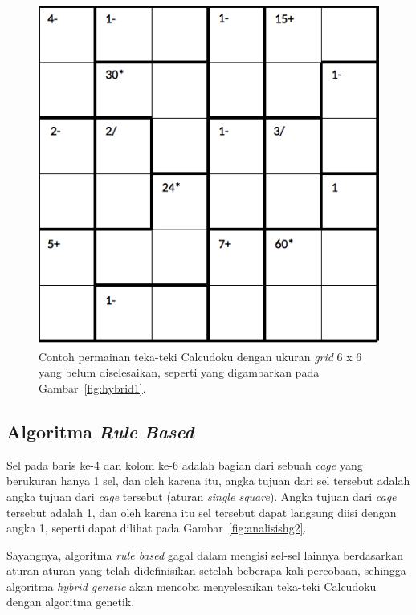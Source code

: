 \begin{figure}
\centering
\captionsetup{justification=centering}
\includegraphics[scale=0.333]{Gambar/hybridgenetic/Puzzle}
\caption[Contoh permainan teka-teki Calcudoku dengan ukuran \textit{grid} 6 x 6 yang belum diselesaikan, seperti yang digambarkan pada Gambar~\ref{fig:hybrid1}. \cite{johanna:12:hybrid}]{Contoh permainan teka-teki Calcudoku dengan ukuran \textit{grid} 6 x 6 yang belum diselesaikan, seperti yang digambarkan pada Gambar~\ref{fig:hybrid1}. \cite{johanna:12:hybrid}}
\label{fig:analisishg1}
\end{figure}

\subsection{Algoritma \textit{Rule Based}}
\label{sec:analisisrb}

Sel pada baris ke-4 dan kolom ke-6 adalah bagian dari sebuah \textit{cage} yang berukuran hanya 1 sel, dan oleh karena itu, angka tujuan dari sel tersebut adalah angka tujuan dari \textit{cage} tersebut (aturan \textit{single square}). Angka tujuan dari \textit{cage} tersebut adalah 1, dan oleh karena itu sel tersebut dapat langsung diisi dengan angka 1, seperti dapat dilihat pada Gambar~\ref{fig:analisishg2}.

Sayangnya, algoritma \textit{rule based} gagal dalam mengisi sel-sel lainnya berdasarkan aturan-aturan yang telah didefinisikan setelah beberapa kali percobaan, sehingga algoritma \textit{hybrid genetic} akan mencoba menyelesaikan teka-teki Calcudoku dengan algoritma genetik.

